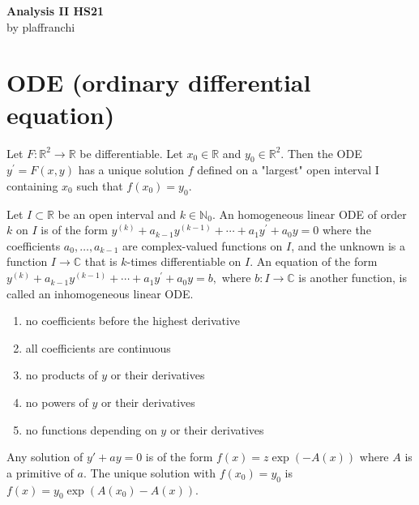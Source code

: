 \documentclass[10pt,landscape, a4paper]{article}
\newcommand{\custombox}[3]{\begin{tcolorbox}[title = \textbf{#1}, colback=#2!10!white, colframe = #2!70!white, coltitle=white]
    #3
    \end{tcolorbox}}
\newcommand{\theorem}[2]{\custombox{Theorem #1}{red}{#2}}
\newcommand{\definition}[2]{\custombox{Definition #1}{orange}{#2}}
\newcommand{\prop}[2]{\custombox{Proposition #1}{black!50!orange!30!yellow}{#2}}
\newcommand{\other}[2]{\custombox{#1}{green!60!black}{#2}}
\begin{document}
\begin{multicols*}{3}
    \begin{center}
        \Large{\textbf{Analysis II HS21}} \\
        \small{by plaffranchi}
    \end{center}
    \section{ODE (ordinary differential equation)}
    \theorem{2.1.6}{Let $F: \mathbb{R}^{2} \rightarrow \mathbb{R}$ be differentiable. Let $x_{0} \in \mathbb{R}$ and $y_{0} \in \mathbb{R}^{2}$. Then the ODE
    $ y^{\prime}=F(x, y) $ has a unique solution $f$ defined on a "largest" open interval I containing $x_{0}$ such that $f\left(x_{0}\right)=y_{0} .$}
    \definition{2.2.1}{Let $I \subset \mathbb{R}$ be an open interval and $k \in \mathbb{N}_0$. An homogeneous linear ODE of order $k$ on $I$ is of the form
    $
        y^{(k)}+a_{k-1} y^{(k-1)}+\cdots+a_{1} y^{\prime}+a_{0} y=0
    $
    where the coefficients $a_{0}, \ldots, a_{k-1}$ are complex-valued functions on $I$, and the unknown is a function $I \to \mathbb{C}$ that is $k$-times differentiable on $I$.
    An equation of the form
    $
        y^{(k)}+a_{k-1} y^{(k-1)}+\cdots+a_{1} y^{\prime}+a_{0} y=b,
    $
    where $b: I \rightarrow \mathbb{C}$ is another function, is called an inhomogeneous linear ODE.}
    \other{Recognize an ODE}{\begin{enumerate}
        \item no coefficients before the highest derivative
        \item all coefficients are continuous
        \item no products of $y$ or their derivatives
        \item no powers of $y$ or their derivatives
        \item no functions depending on $y$ or their derivatives
    \end{enumerate}}



    \prop{2.3.1}{Any solution of $y'+ay=0$ is of the form $f(x)=z\exp(-A(x))$ where $A$ is a primitive of $a$. The unique solution with $f(x_0)=y_0$ is $f(x)= y_0\exp(A(x_0)-A(x))$.}


\end{multicols*}
\end{document}
